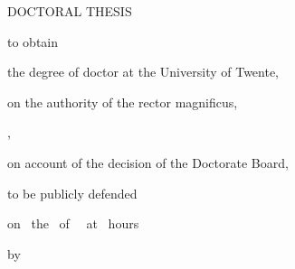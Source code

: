 
\begin{titlingpage}

\thispagestyle{empty}\null\clearpage
\thispagestyle{empty}
\begin{center}
\vspace*{2\bigskipamount}
{\LARGE\bfseries\MakeUppercase{\thesistitle}\par}
\vspace{10mm}
{\large\MakeUppercase{\thesissubtitle}\par}
\vfill
{\Large\thesisauthor\par}
\end{center}
\clearpage
\thispagestyle{empty}\null\clearpage
\thispagestyle{empty}
\begin{center}
\vspace*{2\bigskipamount}
{\LARGE\bfseries\MakeUppercase{\thesistitle}\par}
\medskip
{\large\MakeUppercase{\thesissubtitle}\par}
\vfill
{\Large DOCTORAL THESIS\par}
\bigskip\bigskip
to obtain\par\medskip
the degree of doctor at the University of Twente,\par\medskip
on the authority of the rector magnificus,\par\medskip
\rectorname,\par\medskip
on account of the decision of the Doctorate Board,\par\medskip
to be publicly defended\par\medskip
on \ the \ of \ \thesisyear\ at \ hours\par
\bigskip\bigskip
by\par\bigskip\bigskip
{\bfseries\thesisauthor\par}
\vspace*{2\bigskipamount}

\end{center}
\end{titlingpage}
